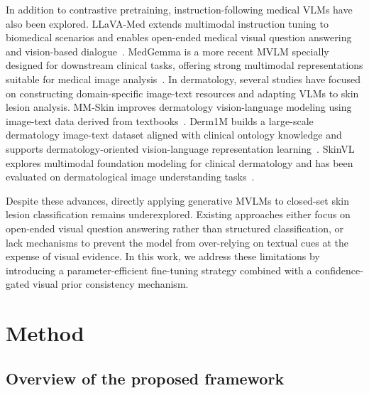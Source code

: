 \documentclass[preprint,12pt]{elsarticle}
\makeatletter
\def@NAT@last@yr{--\NAT@penalty}%
\makeatother
\begin{document}
In addition to contrastive pretraining, instruction-following medical VLMs have also been explored. LLaVA-Med extends multimodal instruction tuning to biomedical scenarios and enables open-ended medical visual question answering and vision-based dialogue~\cite{li2023llavamed}. MedGemma is a more recent MVLM specially designed for downstream clinical tasks, offering strong multimodal representations suitable for medical image analysis~\cite{sellergren2025medgemma}. In dermatology, several studies have focused on constructing domain-specific image-text resources and adapting VLMs to skin lesion analysis. MM-Skin improves dermatology vision-language modeling using image-text data derived from textbooks~\cite{zeng2025mmskin}. Derm1M builds a large-scale dermatology image-text dataset aligned with clinical ontology knowledge and supports dermatology-oriented vision-language representation learning~\cite{yan2025derm1m}. SkinVL explores multimodal foundation modeling for clinical dermatology and has been evaluated on dermatological image understanding tasks~\cite{yan2025multimodal}. 


Despite these advances, directly applying generative MVLMs to closed-set skin lesion classification remains underexplored. Existing approaches either focus on open-ended visual question answering rather than structured classification, or lack mechanisms to prevent the model from over-relying on textual cues at the expense of visual evidence. In this work, we address these limitations by introducing a parameter-efficient fine-tuning strategy combined with a confidence-gated visual prior consistency mechanism.

\section{Method}


\subsection{Overview of the proposed framework}


\end{document}

